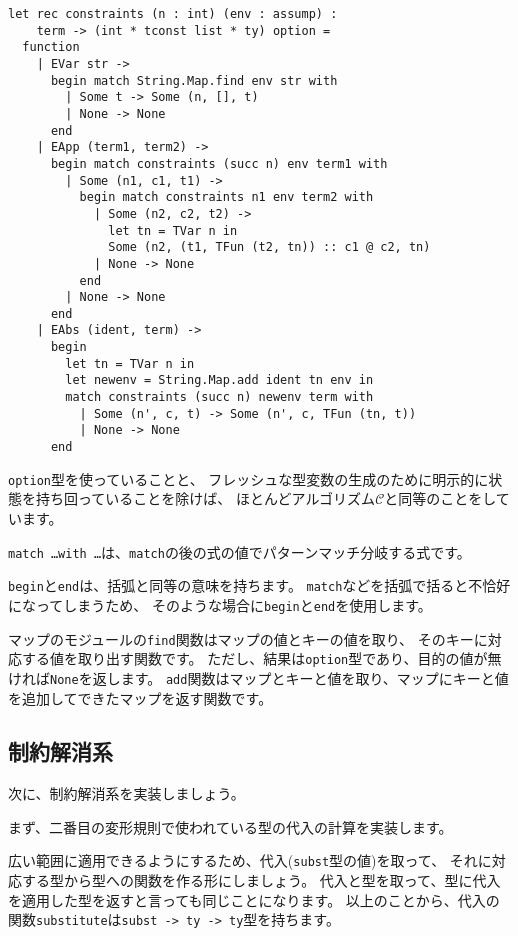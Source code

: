 \begin{lstlisting}[caption=方程式の生成, label=list:ocaml-stlc-constraints]
let rec constraints (n : int) (env : assump) :
    term -> (int * tconst list * ty) option =
  function
    | EVar str ->
      begin match String.Map.find env str with
        | Some t -> Some (n, [], t)
        | None -> None
      end
    | EApp (term1, term2) ->
      begin match constraints (succ n) env term1 with
        | Some (n1, c1, t1) ->
          begin match constraints n1 env term2 with
            | Some (n2, c2, t2) ->
              let tn = TVar n in
              Some (n2, (t1, TFun (t2, tn)) :: c1 @ c2, tn)
            | None -> None
          end
        | None -> None
      end
    | EAbs (ident, term) ->
      begin
        let tn = TVar n in
        let newenv = String.Map.add ident tn env in
        match constraints (succ n) newenv term with
          | Some (n', c, t) -> Some (n', c, TFun (tn, t))
          | None -> None
      end
\end{lstlisting}

\texttt{option}型を使っていることと、
フレッシュな型変数の生成のために明示的に状態を持ち回っていることを除けば、
ほとんどアルゴリズム$\mathcal C$と同等のことをしています。

\texttt{match \dots with \dots}は、\texttt{match}の後の式の値でパターンマッチ分岐する式です。

\texttt{begin}と\texttt{end}は、括弧と同等の意味を持ちます。
\texttt{match}などを括弧で括ると不恰好になってしまうため、
そのような場合に\texttt{begin}と\texttt{end}を使用します。

マップのモジュールの\texttt{find}関数はマップの値とキーの値を取り、
そのキーに対応する値を取り出す関数です。
ただし、結果は\texttt{option}型であり、目的の値が無ければ\texttt{None}を返します。
\texttt{add}関数はマップとキーと値を取り、マップにキーと値を追加してできたマップを返す関数です。

\subsection{制約解消系}

次に、制約解消系を実装しましょう。

まず、二番目の変形規則で使われている型の代入の計算を実装します。

広い範囲に適用できるようにするため、代入(\texttt{subst}型の値)を取って、
それに対応する型から型への関数を作る形にしましょう。
代入と型を取って、型に代入を適用した型を返すと言っても同じことになります。
以上のことから、代入の関数\texttt{substitute}は\texttt{subst -> ty -> ty}型を持ちます。

